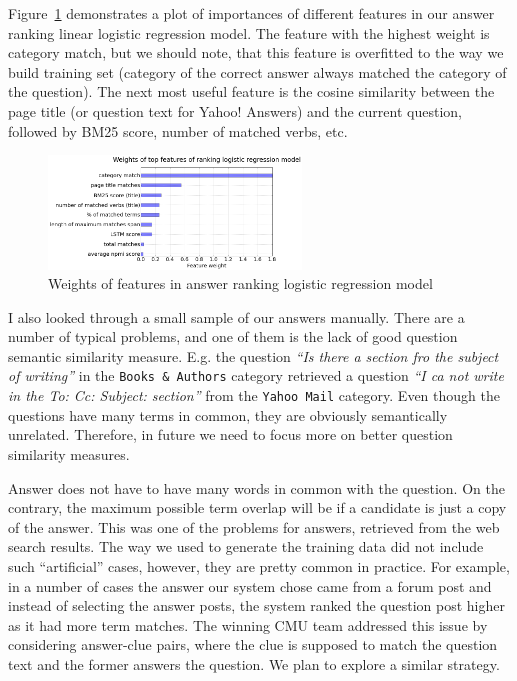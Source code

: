 Figure~\ref{figure:non-factoid:liveqa:features} demonstrates a plot of importances of different features in our answer ranking linear logistic regression model.
The feature with the highest weight is category match, but we should note, that this feature is overfitted to the way we build training set (category of the correct answer always matched the category of the question).
The next most useful feature is the cosine similarity between the page title (or question text for Yahoo! Answers) and the current question, followed by BM25 score, number of matched verbs, etc.

\begin{figure}
	\centering
	\includegraphics[width=0.6\textwidth]{img/liveqa_features}
	\caption{Weights of features in answer ranking logistic regression model}
	\label{figure:non-factoid:liveqa:features}
\end{figure}

I also looked through a small sample of our answers manually.
There are a number of typical problems, and one of them is the lack of good question semantic similarity measure.
E.g. the question \textit{``Is there a section fro the subject of writing''} in the \texttt{Books \& Authors} category retrieved a question \textit{``I ca not write in the To: Cc: Subject: section''} from the \texttt{Yahoo Mail} category.
Even though the questions have many terms in common, they are obviously semantically unrelated.
Therefore, in future we need to focus more on better question similarity measures.

Answer does not have to have many words in common with the question.
On the contrary, the maximum possible term overlap will be if a candidate is just a copy of the answer.
This was one of the problems for answers, retrieved from the web search results.
The way we used to generate the training data did not include such ``artificial'' cases, however, they are pretty common in practice.
For example, in a number of cases the answer our system chose came from a forum post and instead of selecting the answer posts, the system ranked the question post higher as it had more term matches.
The winning CMU team addressed this issue by considering answer-clue pairs, where the clue is supposed to match the question text and the former answers the question.
We plan to explore a similar strategy.

